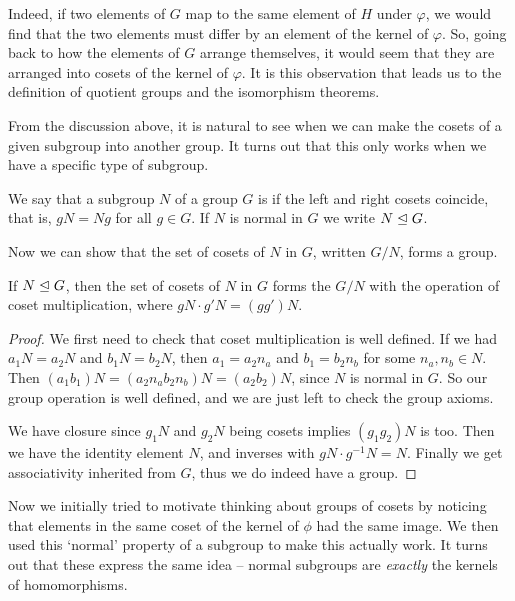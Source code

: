 \documentclass[a4paper]{scrartcl}
\begin{document}
Indeed, if two elements of $G$ map to the same element of $H$ under $\varphi$, we would find that the two elements must differ by an element of the kernel of $\varphi$. So, going back to how the elements of $G$ arrange themselves, it would seem that they are arranged into cosets of the kernel of $\varphi$. It is this observation that leads us to the definition of quotient groups and the isomorphism theorems.


From the discussion above, it is natural to see when we can make the cosets of a given subgroup into another group. It turns out that this only works when we have a specific type of subgroup.

\begin{definition*}
	We say that a subgroup $N$ of a group $G$ is  if the left and right cosets coincide, that is, $gN = Ng$ for all $g \in G$. If $N$ is normal in $G$ we write $N \trianglelefteq G$.
\end{definition*}

Now we can show that the set of cosets of $N$ in $G$, written $G/N$, forms a group.

\begin{theorem*}
	If $N \trianglelefteq G$, then the set of cosets of $N$ in $G$ forms the  $G/N$ with the operation of coset multiplication, where $gN \cdot g'N = (g g')N$.
\end{theorem*}
\begin{proof}
	We first need to check that coset multiplication is well defined. If we had $a_1 N = a_2N$ and $b_1 N = b_2 N$, then $a_1 = a_2 n_a$ and $b_1 = b_2 n_b$ for some $n_a, n_b \in N$. Then $(a_1 b_1)N = (a_2 n_a b_2 n_b)N = (a_2 b_2)N$, since $N$ is normal in $G$. So our group operation is well defined, and we are just left to check the group axioms.

	We have closure since $g_1 N$ and $g_2N$ being cosets implies $(g_1 g_2)N$ is too. Then we have the identity element $N$, and inverses with $gN \cdot g^{-1}N = N$. Finally we get associativity inherited from $G$, thus we do indeed have a group.
\end{proof}

Now we initially tried to motivate thinking about groups of cosets by noticing that elements in the same coset of the kernel of $\phi$ had the same image. We then used this `normal' property of a subgroup to make this actually work. It turns out that these express the same idea -- normal subgroups are \emph{exactly} the kernels of homomorphisms.
\end{document}
